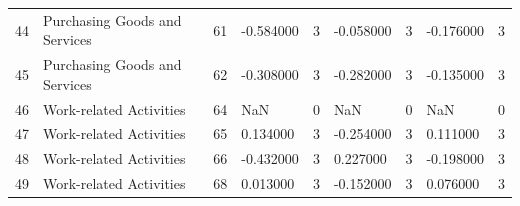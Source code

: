 \begin{tabular}{lllllllll}
44 & Purchasing Goods and Services & 61 & -0.584000 & 3 & -0.058000 & 3 & -0.176000 & 3 \\
45 & Purchasing Goods and Services & 62 & -0.308000 & 3 & -0.282000 & 3 & -0.135000 & 3 \\
46 & Work-related Activities & 64 & NaN & 0 & NaN & 0 & NaN & 0 \\
47 & Work-related Activities & 65 & 0.134000 & 3 & -0.254000 & 3 & 0.111000 & 3 \\
48 & Work-related Activities & 66 & -0.432000 & 3 & 0.227000 & 3 & -0.198000 & 3 \\
49 & Work-related Activities & 68 & 0.013000 & 3 & -0.152000 & 3 & 0.076000 & 3 \\
\bottomrule
\end{tabular}
